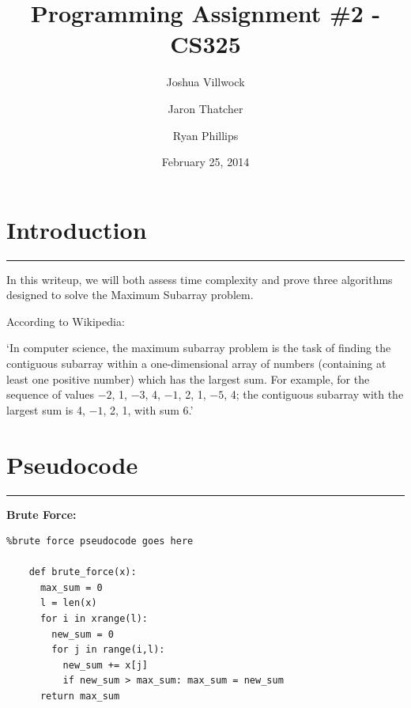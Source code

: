 \documentclass[letterpaper,10pt,titlepage,fleqn]{article}
\begin{document}
\lstset{language=Python} 

\title{Programming Assignment \#2 - CS325}

\author{
	Joshua Villwock \and
	Jaron Thatcher \and
	Ryan Phillips
}

\date{February 25, 2014}
\maketitle







\section*{Introduction}
\hrule

In this writeup, we will both assess time complexity and prove three algorithms designed to solve the Maximum Subarray problem. 
\par

According to Wikipedia:

\par

`In computer science, the maximum subarray problem is the task of finding the contiguous subarray within a one-dimensional array of numbers (containing at least one positive number) which has the largest sum. For example, for the sequence of values $−2$, 1, $−3$, 4, $−1$, 2, 1, $−5$, 4; the contiguous subarray with the largest sum is 4, $−1$, 2, 1, with sum 6.'

\section*{Pseudocode}
\hrule
\begin{centering}

    \textbf{Brute Force:}
    \end{centering}

    \lstset{ numbers=left }

    \begin{lstlisting}%brute force pseudocode goes here

    def brute_force(x): 
      max_sum = 0
      l = len(x)
      for i in xrange(l):
        new_sum = 0
        for j in range(i,l):
          new_sum += x[j] 
          if new_sum > max_sum: max_sum = new_sum
      return max_sum

    \end{lstlisting}
\end{document}
